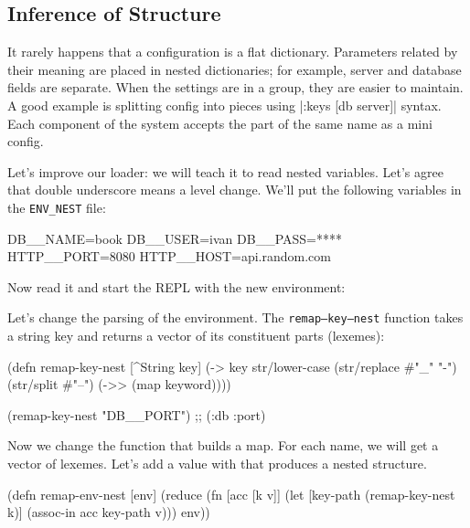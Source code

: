 \subsection{Inference of Structure}


It rarely happens that a configuration is a flat dictionary. Parameters related by their meaning are placed in nested dictionaries; for example, server and database fields are separate. When the settings are in a group, they are easier to maintain. A good example is splitting config into pieces using \spverb|{:keys [db server]}| syntax. Each component of the system accepts the part of the same name as a mini config.

Let's improve our loader: we will teach it to read nested variables. Let's agree that double underscore means a level change. We'll put the following variables
in the \verb|ENV_NEST| file:

\begin{bash}
DB__NAME=book
DB__USER=ivan
DB__PASS=****
HTTP__PORT=8080
HTTP__HOST=api.random.com
\end{bash}


\noindent
Now read it and start the REPL with the new environment:


Let's change the parsing of the environment. The \texttt{remap--key--nest} function takes a string key and returns a vector of its constituent parts (lexemes):

\begin{clojure}
(defn remap-key-nest
  [^String key]
  (-> key
      str/lower-case
      (str/replace #"_" "-")
      (str/split #"--")
      (->> (map keyword))))

(remap-key-nest "DB__PORT")
;; (:db :port)
\end{clojure}


Now we change the function that builds a map. For each name, we will get a vector of lexemes. Let's add a value with  that produces a nested structure.

\begin{clojure}
(defn remap-env-nest
  [env]
  (reduce
   (fn [acc [k v]]
     (let [key-path (remap-key-nest k)]
       (assoc-in acc key-path v)))
   {}
   env))
\end{clojure}


